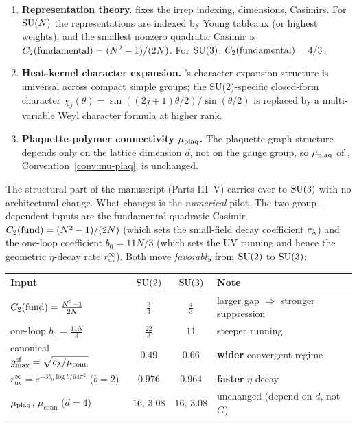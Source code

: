 \begin{enumerate}[label=(E\arabic*)]
  \item \textbf{Representation theory.}
     fixes the irrep indexing,
    dimensions, Casimirs.  For $\mathrm{SU}(N)$ the representations are
    indexed by Young tableaux (or highest weights), and the
    smallest nonzero quadratic Casimir is
    $C_2(\mathrm{fundamental}) = (N^2 - 1)/(2N)$.
    For $\mathrm{SU}(3)$: $C_2(\mathrm{fundamental}) = 4/3$.
  \item \textbf{Heat-kernel character expansion.}
    's character-expansion structure is
    universal across compact simple groups; the SU(2)-specific
    closed-form character $\chi_j(\theta) = \sin((2j+1)\theta/2)
    / \sin(\theta/2)$ is replaced by a multi-variable Weyl
    character formula at higher rank.
  \item \textbf{Plaquette-polymer connectivity $\mu_{\mathrm{plaq}}$.}
    The plaquette graph structure depends only on the lattice
    dimension $d$, not on the gauge group, so $\mu_{\mathrm{plaq}}$ of
    ,
    Convention~\ref{conv:mu-plaq}, is unchanged.
\end{enumerate}

The structural part of the manuscript (Parts III--V) carries over
to $\mathrm{SU}(3)$ with no architectural change.  What changes is the
\emph{numerical} pilot.  The two group-dependent inputs are the
fundamental quadratic Casimir $C_2(\mathrm{fund}) = (N^2-1)/(2N)$
(which sets the small-field decay coefficient $c_\lambda$) and the
one-loop coefficient $b_0 = 11N/3$ (which sets the UV running and
hence the geometric $\eta$-decay rate $r_{\mathrm{uv}}^\infty$).  Both
move \emph{favorably} from $\mathrm{SU}(2)$ to $\mathrm{SU}(3)$:

\begin{center}
\renewcommand{\arraystretch}{1.3}
\begin{tabular}{lccl}
\toprule
Input & $\mathrm{SU}(2)$ & $\mathrm{SU}(3)$ & Note \\
\midrule
$C_2(\mathrm{fund}) = \tfrac{N^2-1}{2N}$ & $\tfrac34$ & $\tfrac43$ &
  larger gap $\Rightarrow$ stronger suppression \\
one-loop $b_0 = \tfrac{11N}{3}$ & $\tfrac{22}{3}$ & $11$ &
  steeper running \\
canonical $g_{\max}^{\mathrm{sf}} = \sqrt{c_\lambda/\mu_{\mathrm{conn}}}$ &
  $0.49$ & $0.66$ & \textbf{wider} convergent regime \\
$r_{\mathrm{uv}}^\infty = e^{-3 b_0 \log b / 64\pi^2}$ ($b=2$) &
  $0.976$ & $0.964$ & \textbf{faster} $\eta$-decay \\
$\mu_{\mathrm{plaq}}$, $\mu_{\mathrm{conn}}$ ($d = 4$) & $16,\,3.08$ & $16,\,3.08$ &
  unchanged (depend on $d$, not $G$) \\
\bottomrule
\end{tabular}
\end{center}

